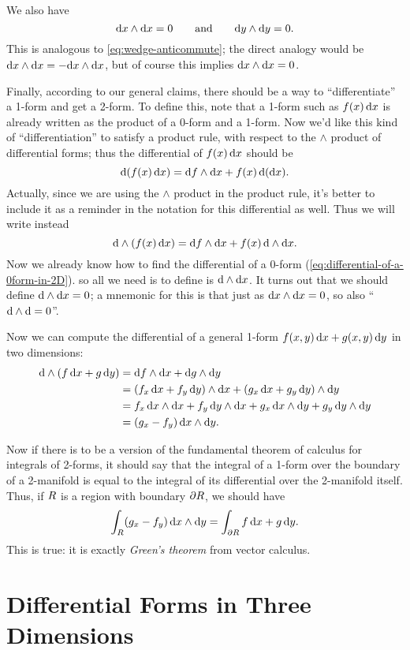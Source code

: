 \documentclass[12pt]{amsart}
\begin{document}
We also have
\[ {\mathrm{d} x} \wedge {\ensuremath{\mathrm{d} x}} = 0 \qquad\text{and}\qquad {\ensuremath{\mathrm{d} y}}\wedge {\ensuremath{\mathrm{d} y}} = 0. \]
This is analogous to \cref{eq:wedge-anticommute}; the direct analogy would be ${\mathrm{d} x}\wedge{\ensuremath{\mathrm{d} x}} = - {\mathrm{d} x}\wedge{\ensuremath{\mathrm{d} x}}$, but of course this implies ${\mathrm{d} x}\wedge{\ensuremath{\mathrm{d} x}}=0$.

Finally, according to our general claims, there should be a way to ``differentiate'' a 1-form and get a 2-form.
To define this, note that a 1-form such as $f(x)\,{\mathrm{d} x}$ is already written as the product of a 0-form and a 1-form.
Now we'd like this kind of ``differentiation'' to satisfy a product rule, with respect to the $\wedge$ product of differential forms; thus the differential of $f(x)\,{\mathrm{d} x}$ should be
\[ \mathrm{d}(f(x)\,{\mathrm{d} x}) =  {\mathrm{d} f} \wedge{\ensuremath{\mathrm{d} x}} + f(x)\, \mathrm{d}({\mathrm{d} x}). \]
Actually, since we are using the $\wedge$ product in the product rule, it's better to include it as a reminder in the notation for this differential as well.
Thus we will write instead
\[ \mathrm{d}\wedge(f(x)\,{\mathrm{d} x}) =  {\mathrm{d} f} \wedge{\ensuremath{\mathrm{d} x}} + f(x)\, \mathrm{d}\wedge{\ensuremath{\mathrm{d} x}}. \]
Now we already know how to find the differential of a 0-form (\cref{eq:differential-of-a-0form-in-2D}). so all we need is to define is $\mathrm{d}\wedge{\ensuremath{\mathrm{d} x}}$.
It turns out that we should define $\mathrm{d}\wedge{\ensuremath{\mathrm{d} x}}=0$; a mnemonic for this is that just as ${\mathrm{d} x}\wedge {\ensuremath{\mathrm{d} x}} = 0$, so also ``$\mathrm{d}\wedge\mathrm{d} = 0$''.

Now we can compute the differential of a general 1-form $f(x,y)\,{\mathrm{d} x} + g(x,y)\,{\mathrm{d} y}$ in two dimensions:
\begin{align*}
  \mathrm{d}\wedge(f\,{\mathrm{d} x} + g\,{\mathrm{d} y})
  &= {\mathrm{d} f} \wedge {\ensuremath{\mathrm{d} x}} + {\mathrm{d} g} \wedge{\ensuremath{\mathrm{d} y}}\\
  &= ({f}_{x}\, {\mathrm{d} x} + {f}_{y}\, {\mathrm{d} y}) \wedge {\ensuremath{\mathrm{d} x}} + ({g}_{x} \,{\mathrm{d} x}+{g}_{y}\,{\mathrm{d} y})\wedge{\ensuremath{\mathrm{d} y}} \\
  &= {f}_{x}\, {\mathrm{d} x}\wedge{\ensuremath{\mathrm{d} x}} + {f}_{y}\, {\mathrm{d} y}\wedge {\ensuremath{\mathrm{d} x}} + {g}_{x} \,{\mathrm{d} x} \wedge{\ensuremath{\mathrm{d} y}} + {g}_{y}\,{\mathrm{d} y}\wedge{\ensuremath{\mathrm{d} y}} \\
  &= ({g}_{x} - {f}_{y})\, {\mathrm{d} x}\wedge{\ensuremath{\mathrm{d} y}}.
\end{align*}

Now if there is to be a version of the fundamental theorem of calculus for integrals of 2-forms, it should say that the integral of a 1-form over the boundary of a 2-manifold is equal to the integral of its differential over the 2-manifold itself.
Thus, if $R$ is a region with boundary $\partial R$, we should have
\[ \int_{R} ({g}_{x} - {f}_{y})\, {\mathrm{d} x}\wedge{\ensuremath{\mathrm{d} y}} = \int_{\partial R} f\,{\mathrm{d} x} + g\,{\mathrm{d} y}. \]
This is true: it is exactly \emph{Green's theorem} from vector calculus.

\section{Differential Forms in Three Dimensions}
\label{sec:forms-in-3D}
\end{document}
